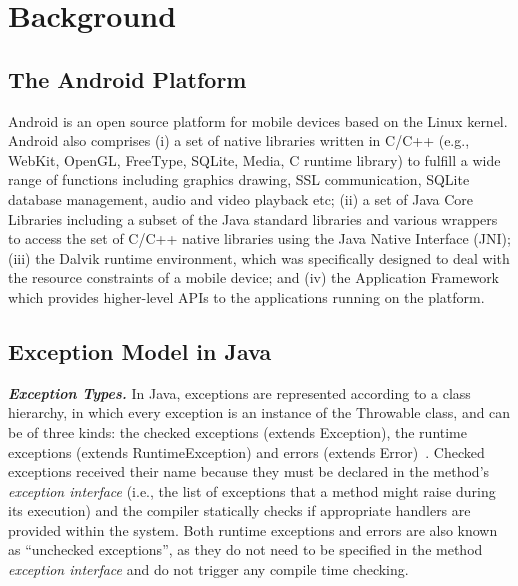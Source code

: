 \section{Background}
\label{sec:back}

\subsection{The Android Platform}
Android is an open source platform for mobile devices based on the Linux kernel.
Android also comprises (i) a set of native libraries written in C/C++
(e.g., WebKit, OpenGL, FreeType, SQLite, Media, C runtime library) to
fulfill a wide range of functions including graphics drawing, SSL communication,
SQLite database management, audio and video playback etc; (ii) a set of Java Core Libraries
including a subset of the Java standard libraries and various wrappers to access the set of C/C++
native libraries using the Java Native Interface (JNI); (iii) the Dalvik runtime environment, which was specifically designed to deal with the resource constraints of a mobile device;
 and (iv) the Application Framework which provides higher-level APIs to the applications
 running on the platform.


\subsection{Exception Model in Java} \label{sec:extypes}

\emph{\textbf{Exception Types.}} In Java, exceptions are represented according to a class hierarchy, in which
 every exception is an instance of the Throwable class, and can be of three kinds: the checked exceptions
(extends Exception), the runtime exceptions (extends RuntimeException) and errors
(extends Error)~\cite{gosling2000java}. Checked exceptions received their name
 because they must be declared in the method's \emph{exception interface} (i.e., the list of exceptions that a method
might raise during its execution) and the compiler statically checks if
 appropriate handlers are provided within the system.
Both runtime exceptions and errors are also known as ``unchecked exceptions'', as
they do not need to be specified in the method \emph{exception interface} and do not trigger any
compile time checking.

